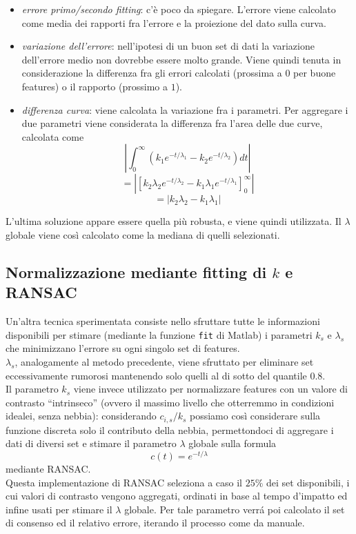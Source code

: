 \documentclass[12pt]{report}
\begin{document}
\begin{itemize}
	\item	\emph{errore primo/secondo fitting}: c'\`e poco da spiegare. L'errore viene calcolato come media dei rapporti fra l'errore e la proiezione del dato sulla curva.
	\item	\emph{variazione dell'errore}: nell'ipotesi di un buon set di dati la variazione dell'errore medio non dovrebbe essere molto grande. Viene quindi tenuta in considerazione la differenza fra gli errori calcolati (prossima a $0$ per buone features) o il rapporto (prossimo a $1$).
	\item	\emph{differenza curva}: viene calcolata la variazione fra i parametri. Per aggregare i due parametri viene considerata la differenza fra l'area delle due curve, calcolata come $$\left|\int^{\infty}_0\left(k_1e^{-t/\lambda_1} - k_2e^{-t/\lambda_2}\right)dt\right|$$ $$= \left|\left[ k_2\lambda_2e^{-t/\lambda_2} - k_1\lambda_1e^{-t/\lambda_1} \right]^\infty_0\right|$$ $$ = \left|k_2\lambda_2 - k_1\lambda_1\right|$$
\end{itemize}

\noindent L'ultima soluzione appare essere quella pi\`u robusta, e viene quindi utilizzata. Il $\lambda$ globale viene cos\`i calcolato come la mediana di quelli selezionati.

\subsection{Normalizzazione mediante fitting di $k$ e RANSAC}
\noindent Un'altra tecnica sperimentata consiste nello sfruttare tutte le informazioni disponibili  per stimare (mediante la funzione \verb|fit| di Matlab) i parametri $k_s$ e $\lambda_s$ che minimizzano l'errore su ogni singolo set di features.\\
$\lambda_s$, analogamente al metodo precedente, viene sfruttato per eliminare set eccessivamente rumorosi mantenendo solo quelli al di sotto del quantile $0.8$.\\
Il parametro $k_s$ viene invece utilizzato per normalizzare features con un valore di contrasto ``intrinseco'' (ovvero il massimo livello che otterremmo in condizioni idealei, senza nebbia): considerando $c_{i,s}/k_s$ possiamo cos\`i considerare sulla funzione discreta solo il contributo della nebbia, permettondoci di aggregare i dati di diversi set e stimare il parametro $\lambda$ globale sulla formula $$ c(t) = e^{-t/\lambda} $$ mediante RANSAC.\\
Questa implementazione di RANSAC seleziona a caso il $25\%$ dei set disponibili, i cui valori di contrasto vengono aggregati, ordinati in base al tempo d'impatto ed infine usati per stimare il $\lambda$ globale. Per tale parametro verr\'a poi calcolato il set di consenso ed il relativo errore, iterando il processo come da manuale.
\end{document}
